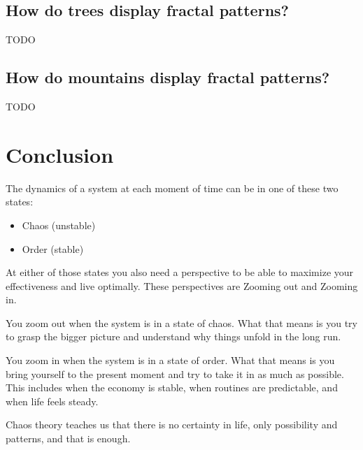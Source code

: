 \documentclass[12pt]{article}
\begin{document}
\subsection{How do trees display fractal patterns?}
TODO

\subsection{How do mountains display fractal patterns?}
TODO

\section{Conclusion}

The dynamics of a system at each moment of time can be in one of these two states:
\begin{itemize}
    \item Chaos (unstable)
    \item Order (stable)
\end{itemize}


At either of those states you also need a perspective to be able to maximize your effectiveness and live optimally. These perspectives are Zooming out and Zooming in. 

You zoom out when the system is in a state of chaos. What that means is you try to grasp the bigger picture and understand why things unfold in the long run.

You zoom in when the system is in a state of order. What that means is you bring yourself to the present moment and try to take it in as much as possible. This includes when the economy is stable, when routines are predictable, and when life feels steady.

Chaos theory teaches us that there is no certainty in life, only possibility and patterns, and that is enough.


\nocite{*} 
 

\end{document}
